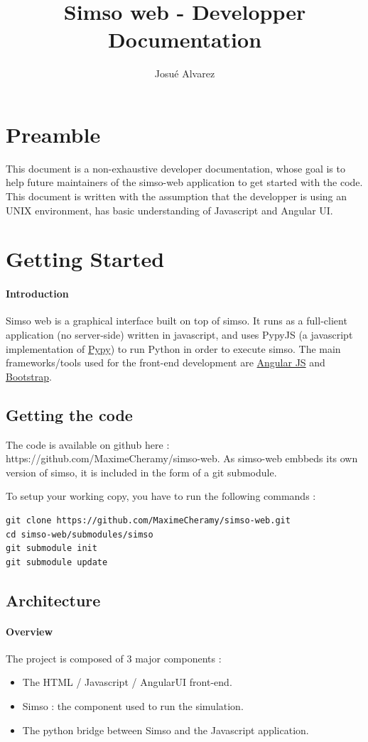 \documentclass[10pt,a4paper]{article}
\author{Josué Alvarez}
\title{Simso web - Developper Documentation}
\begin{document}
\maketitle
\newpage
\section{Preamble}
This document is a non-exhaustive developer documentation, whose goal is to help future maintainers of the simso-web application to get started with the code. 
This document is written with the assumption that the developper is using an UNIX environment, has basic understanding of Javascript and Angular UI.

\section{Getting Started}
\paragraph{Introduction}
Simso web is a graphical interface built on top of simso. It runs as a full-client application (no server-side) written in javascript, and uses PypyJS (a javascript implementation of \href{"http://www.pypy.org/"}{Pypy}) to run Python in order to execute simso.
The main frameworks/tools used for the front-end development are \href{"https://angularjs.org/"}{Angular JS} and \href{"http://getbootstrap.com/"}{Bootstrap}.

\subsection{Getting the code}
The code is available on github here : https://github.com/MaximeCheramy/simso-web. 
As simso-web embbeds its own version of simso, it is included in the form of a git submodule.

To setup your working copy, you have to run the following commands :
\begin{lstlisting}
git clone https://github.com/MaximeCheramy/simso-web.git
cd simso-web/submodules/simso
git submodule init
git submodule update
\end{lstlisting}

\subsection{Architecture}
\paragraph{Overview}
The project is composed of 3 major components :
\begin{itemize}
\item The HTML / Javascript / AngularUI front-end.
\item Simso : the component used to run the simulation.
\item The python bridge between Simso and the Javascript application.
\end{itemize}
\end{document}
